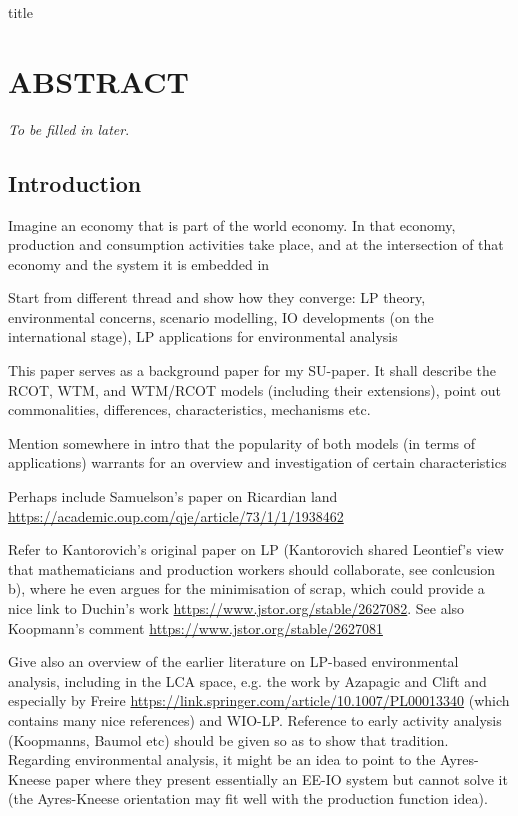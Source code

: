 \documentclass{article}
\begin{document}
{title}

\frontmatter
\tableofcontents

\mainmatter
\linenumbers

{\huge{\multiTitle}}

\section*{ABSTRACT}
\emph{To be filled in later}.

\begin{refsection}

\section{Introduction}

Imagine an economy that is part of the world economy. In that economy, production and consumption activities take place, and at the intersection of that economy and the system it is embedded in

Start from different thread and show how they converge: LP theory, environmental concerns, scenario modelling, IO developments (on the international stage), LP applications for environmental analysis


This paper serves as a background paper for my SU-paper. It shall describe the RCOT, WTM, and WTM/RCOT models (including their extensions), point out commonalities, differences, characteristics, mechanisms etc.

Mention somewhere in intro that the popularity of both models (in terms of applications) warrants for an overview and investigation of certain characteristics

Perhaps include Samuelson's paper on Ricardian land \url{https://academic.oup.com/qje/article/73/1/1/1938462}

Refer to Kantorovich's original paper on LP (Kantorovich shared Leontief's view that mathematicians and production workers should collaborate, see conlcusion b), where he even argues for the minimisation of scrap, which could provide a nice link to Duchin's work \url{https://www.jstor.org/stable/2627082}. See also Koopmann's comment \url{https://www.jstor.org/stable/2627081}

Give also an overview of the earlier literature on LP-based environmental analysis, including in the LCA space, e.g. the work by Azapagic and Clift and especially by Freire \url{https://link.springer.com/article/10.1007/PL00013340} (which contains many nice references) and WIO-LP. Reference to early activity analysis (Koopmanns, Baumol etc) should be given so as to show that tradition. Regarding environmental analysis, it might be an idea to point to the Ayres-Kneese paper where they present essentially an EE-IO system but cannot solve it (the Ayres-Kneese orientation may fit well with the production function idea).


\end{refsection}
\end{document}
